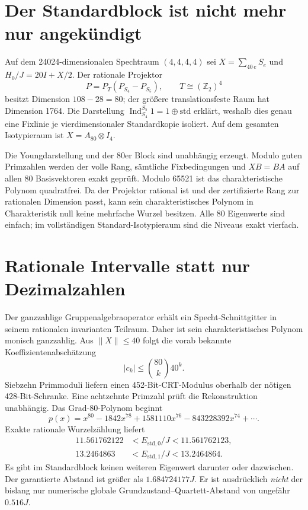 \section{Der Standardblock ist nicht mehr nur angekündigt}
Auf dem 24024-dimensionalen Spechtraum $(4,4,4,4)$ sei $X=\sum_{40\,e}S_e$ und $H_0/J=20I+X/2$. Der rationale Projektor
\[
P=P_T(P_{S_4}-P_{S_5}),\qquad T\cong(\mathbb Z_2)^4
\]
besitzt Dimension $108-28=80$; der größere translationsfeste Raum hat Dimension 1764. Die Darstellung $\operatorname{Ind}_{S_4}^{S_5}1=1\oplus\mathrm{std}$ erklärt, weshalb dies genau eine Fixlinie je vierdimensionaler Standardkopie isoliert. Auf dem gesamten Isotypieraum ist $X=A_{80}\otimes I_4$.

Die Youngdarstellung und der 80er Block sind unabhängig erzeugt. Modulo guten Primzahlen werden der volle Rang, sämtliche Fixbedingungen und $XB=BA$ auf allen 80 Basisvektoren exakt geprüft. Modulo 65521 ist das charakteristische Polynom quadratfrei. Da der Projektor rational ist und der zertifizierte Rang zur rationalen Dimension passt, kann sein charakteristisches Polynom in Charakteristik null keine mehrfache Wurzel besitzen. Alle 80 Eigenwerte sind einfach; im vollständigen Standard-Isotypieraum sind die Niveaus exakt vierfach.

\section{Rationale Intervalle statt nur Dezimalzahlen}
Der ganzzahlige Gruppenalgebraoperator erhält ein Specht-Schnittgitter in seinem rationalen invarianten Teilraum. Daher ist sein charakteristisches Polynom monisch ganzzahlig. Aus $\|X\|\le40$ folgt die vorab bekannte Koeffizientenabschätzung
\[
|c_k|\le {80\choose k}40^k.
\]
Siebzehn Primmoduli liefern einen 452-Bit-CRT-Modulus oberhalb der nötigen 428-Bit-Schranke. Eine achtzehnte Primzahl prüft die Rekonstruktion unabhängig. Das Grad-80-Polynom beginnt
\[
p(x)=x^{80}-1842x^{78}+1581110x^{76}-843228392x^{74}+\cdots.
\]
Exakte rationale Wurzelzählung liefert
\begin{align*}
11.561762122&<E_{\mathrm{std},0}/J<11.561762123,\\
13.2464863&<E_{\mathrm{std},1}/J<13.2464864.
\end{align*}
Es gibt im Standardblock keinen weiteren Eigenwert darunter oder dazwischen. Der garantierte Abstand ist größer als $1.684724177J$. Er ist ausdrücklich \emph{nicht} der bislang nur numerische globale Grundzustand--Quartett-Abstand von ungefähr $0.516J$.

